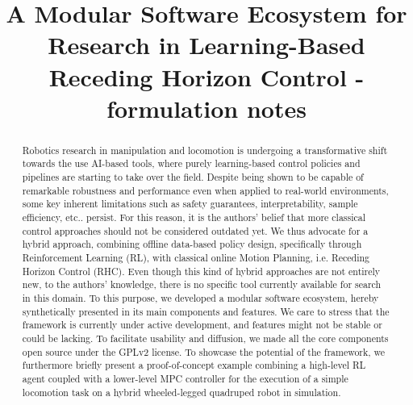 \documentclass[letterpaper, 10 pt, conference]{ieeeconf}  %
\begin{document}
	
	\title{\LARGE \bf
		A Modular Software Ecosystem for Research in Learning-Based Receding Horizon Control - formulation notes
	}
	
	\author{
	}
	
	\maketitle
	
	\begingroup\renewcommand{}
	\endgroup
	
	\begingroup\renewcommand{}
	\endgroup
	
	\setlength{\textfloatsep}{12.0pt plus 8.0pt minus .0pt}
	
	\begin{abstract}
		Robotics research in manipulation and locomotion is undergoing a transformative shift towards the use AI-based tools, where purely learning-based control policies and pipelines are starting to take over the field. Despite being shown to be capable of remarkable robustness and performance even when applied to real-world environments, some key inherent limitations such as safety guarantees, interpretability, sample efficiency, etc.. persist. For this reason, it is the authors' belief that more classical control approaches should not be considered outdated yet. We thus advocate for a hybrid approach, combining offline data-based policy design, specifically through Reinforcement Learning (RL), with classical online Motion Planning, i.e. Receding Horizon Control (RHC). Even though this kind of hybrid approaches are not entirely new, to the authors' knowledge, there is no specific tool currently available for search in this domain. To this purpose, we developed a modular software ecosystem, hereby synthetically presented in its main components and features. We care to stress that the framework is currently under active development, and features might not be stable or could be lacking. To facilitate usability and diffusion, we made all the core components open source under the GPLv2 license. To showcase the potential of the framework, we furthermore briefly present a proof-of-concept example combining a high-level RL agent coupled with a lower-level MPC controller for the execution of a simple locomotion task on a hybrid wheeled-legged quadruped robot in simulation.
	\end{abstract}
	
\end{document}
